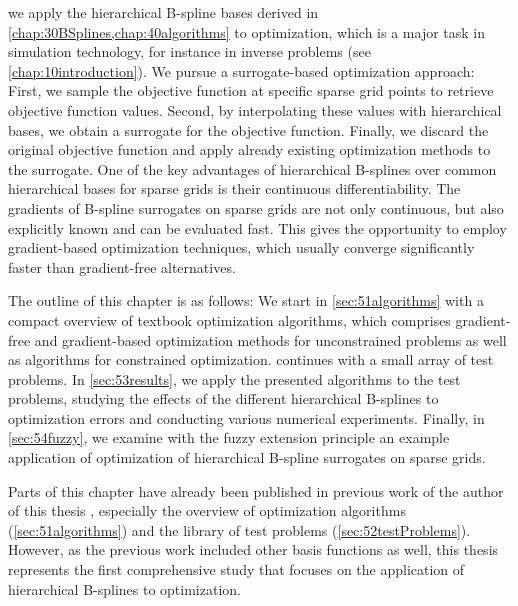 
\label{chap:50optimization}

we apply the hierarchical B-spline bases derived in
\cref{chap:30BSplines,chap:40algorithms} to optimization,
which is a major task in simulation technology,
for instance in inverse problems (see \cref{chap:10introduction}).
We pursue a surrogate-based optimization approach:
First, we sample the objective function at specific sparse grid points
to retrieve objective function values.
Second, by interpolating these values with hierarchical bases,
we obtain a surrogate for the objective function.
Finally, we discard the original objective function and apply
already existing optimization methods to the surrogate.
One of the key advantages of hierarchical B-splines
over common hierarchical bases for
sparse grids is their continuous differentiability.
The gradients of B-spline surrogates on sparse grids are not only continuous,
but also explicitly known and can be evaluated fast.
This gives the opportunity to employ gradient-based optimization techniques,
which usually converge significantly faster than gradient-free alternatives.

The outline of this chapter is as follows:
We start in \cref{sec:51algorithms}
with a compact overview of textbook optimization algorithms,
which comprises gradient-free and gradient-based optimization methods
for unconstrained problems as well as algorithms for constrained optimization.
 continues with a small array of test problems.
In \cref{sec:53results}, we apply the presented algorithms
to the test problems, studying the effects of the different
hierarchical B-splines to optimization errors and conducting various
numerical experiments.
Finally, in \cref{sec:54fuzzy}, we examine with the fuzzy extension principle
an example application of optimization of hierarchical B-spline surrogates on
sparse grids.

Parts of this chapter have already been published in previous work
of the author of this thesis \cite{Valentin14Hierarchische}, especially
the overview of optimization algorithms (\cref{sec:51algorithms})
and the library of test problems (\cref{sec:52testProblems}).
However, as the previous work included other basis functions as well,
this thesis represents the first comprehensive study
that focuses on the application of hierarchical B-splines to optimization.






\cleardoublepage
